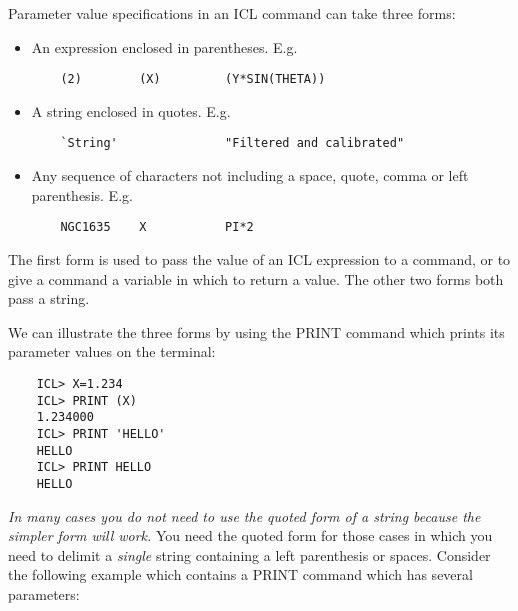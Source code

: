 Parameter value specifications in an ICL command can take three forms:
\begin{itemize}
\item An expression enclosed in parentheses. E.g.

\begin{small}
\begin{verbatim}
    (2)        (X)         (Y*SIN(THETA))
\end{verbatim}
\end{small}

\item A string enclosed in quotes. E.g.

\begin{small}
\begin{verbatim}
    `String'               "Filtered and calibrated"
\end{verbatim}
\end{small}

\item Any sequence of characters not including a space, quote, comma or left
 parenthesis. E.g.

\begin{small}
\begin{verbatim}
    NGC1635    X           PI*2
\end{verbatim}
\end{small}

\end{itemize}
The first form is used to pass the value of an ICL expression to a command, or
to give a command a variable in which to return a value.
The other two forms both pass a string.

We can illustrate the three forms by using the PRINT command which prints its
parameter values on the terminal:

\begin{small}
\begin{verbatim}
    ICL> X=1.234
    ICL> PRINT (X)
    1.234000
    ICL> PRINT 'HELLO'
    HELLO
    ICL> PRINT HELLO
    HELLO
\end{verbatim}
\end{small}

{\em In many cases you do not need to use the quoted form of a string because
the simpler form will work.}
You need the quoted form for those cases in which you need to delimit a
{\em single} string containing a left parenthesis or spaces.
Consider the following example which contains a PRINT command which has several
parameters:

